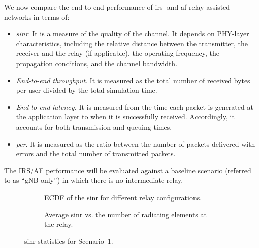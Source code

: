 We now compare the end-to-end performance of \gls{irs}- and \gls{af}-relay assisted networks in terms of:
\begin{itemize}
    \item \emph{\gls{sinr}}. It is a measure of the quality of the channel. 
    It depends on PHY-layer characteristics, including the relative distance between the transmitter, the receiver and the relay (if applicable), the operating frequency, the propagation conditions, %
    and the channel bandwidth. %
    \item \emph{End-to-end throughput}. %
     It is measured as the total number of received bytes per user divided by the total simulation time. 
    \item \emph{End-to-end latency.} It is measured from the time each packet is generated at the application layer to when it is successfully received.
  Accordingly, it accounts for both transmission and queuing times. %
 \item \emph{\gls{per}}. It is measured as the ratio between the number of packets delivered with errors and the total number of transmitted packets.
\end{itemize}
The IRS/AF performance will be evaluated against a baseline scenario (referred to as “gNB-only”) in which there is no intermediate relay.

\begin{figure}
  \centering
  \begin{subfigure}[t]{\columnwidth}
    \centering
    \setlength{}
    \setlength{}
    
    \vspace*{-3mm}
    \caption{ECDF of the \gls{sinr} for different relay configurations.\vspace{0.5cm}}
    \label{Fig:sinr_all}
  \end{subfigure}
 \hfill
  \begin{subfigure}[t]{\columnwidth}
    \centering
    \setlength{}
    \setlength{}
    
    \vspace*{-3mm}
    \caption{Average \gls{sinr} vs. the number of radiating elements at the relay.}
    \vspace*{3mm}
    \label{Fig:sinr_vs_n}
  \end{subfigure}
  \caption{\gls{sinr} statistics for Scenario~1.}
  \label{Fig:sinr}
\end{figure}

